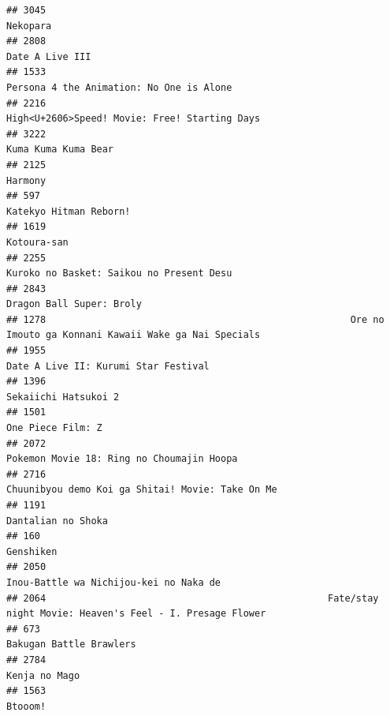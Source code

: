 \documentclass[
]{article}
\begin{document}
\begin{verbatim}
## 3045                                                                                                  Nekopara
## 2808                                                                                           Date A Live III
## 1533                                                                  Persona 4 the Animation: No One is Alone
## 2216                                                             High<U+2606>Speed! Movie: Free! Starting Days
## 3222                                                                                       Kuma Kuma Kuma Bear
## 2125                                                                                                   Harmony
## 597                                                                                     Katekyo Hitman Reborn!
## 1619                                                                                               Kotoura-san
## 2255                                                                  Kuroko no Basket: Saikou no Present Desu
## 2843                                                                                  Dragon Ball Super: Broly
## 1278                                                      Ore no Imouto ga Konnani Kawaii Wake ga Nai Specials
## 1955                                                                      Date A Live II: Kurumi Star Festival
## 1396                                                                                      Sekaiichi Hatsukoi 2
## 1501                                                                                         One Piece Film: Z
## 2072                                                                 Pokemon Movie 18: Ring no Choumajin Hoopa
## 2716                                                          Chuunibyou demo Koi ga Shitai! Movie: Take On Me
## 1191                                                                                        Dantalian no Shoka
## 160                                                                                                  Genshiken
## 2050                                                                    Inou-Battle wa Nichijou-kei no Naka de
## 2064                                                  Fate/stay night Movie: Heaven's Feel - I. Presage Flower
## 673                                                                                    Bakugan Battle Brawlers
## 2784                                                                                             Kenja no Mago
## 1563                                                                                                   Btooom!

\end{verbatim}
\end{document}
